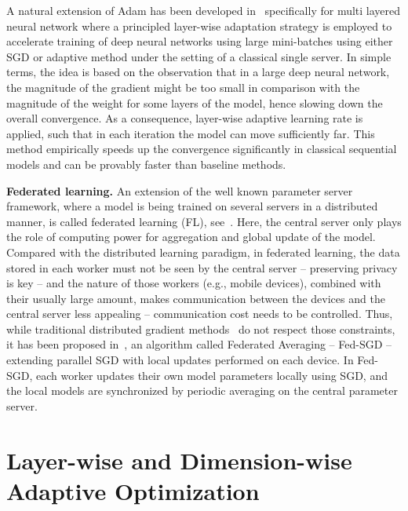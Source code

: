 \documentclass[nohyperref]{article}
\begin{document}
A natural extension of Adam has been developed in~\citet{you2019large} specifically for multi layered neural network where a principled layer-wise adaptation strategy is employed to accelerate training of deep neural networks using large mini-batches using either SGD or adaptive method under the setting of a classical single server. 
In simple terms, the idea is based on the observation that in a large deep neural network, the magnitude of the gradient might be too small in comparison with the magnitude of the weight for some layers of the model, hence slowing down the overall convergence. 
As a consequence, layer-wise adaptive learning rate is applied, such that in each iteration the model can move sufficiently far. 
This method empirically speeds up the convergence significantly in classical sequential models and can be provably faster than baseline methods.


\vspace{0.1in}
\noindent\textbf{Federated learning.}
An extension of the well known parameter server framework, where a model is being trained on several servers in a distributed manner, is called federated learning (FL), see~\citet{konevcny2016federated}.
Here, the central server only plays the role of computing power for aggregation and global update of the model.
Compared with the distributed learning paradigm, in federated learning, the data stored in each worker must not be seen by the central server -- preserving privacy is key -- and the nature of those workers (e.g., mobile devices), combined with their usually large amount, makes communication between the devices and the central server less appealing -- communication cost needs to be controlled.
Thus, while traditional distributed gradient methods~\citep{recht2011hogwild,li2014scaling,zhao2020distributed} do not respect those constraints, it has been proposed in~\citet{mcmahan2017communication}, an algorithm called Federated Averaging -- Fed-SGD -- extending parallel SGD with local updates performed on each device. 
In Fed-SGD, each worker updates their own model parameters locally using SGD, and the local models are synchronized by periodic averaging on the central parameter server.

\section{Layer-wise and Dimension-wise Adaptive Optimization}\label{sec:main}
\end{document}
